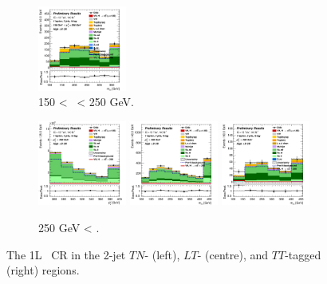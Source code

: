\begin{figure}[h!]
\begin{subfigure}[b]{\textwidth}
        \includegraphics[width=0.32\textwidth]{Images/VH/Own_fit/postfit_VHcc/Region_distmBB_BMax250_BMin150_DCRHigh_J2_TTypett_T2_L1_Y6051_GlobalFit_conditionnal_mu1.png}
        \caption{150 < \ptv\ < 250 GeV.}
        \label{fig:plots_VHcc_1L_150_CRH_2J}
    \end{subfigure}
    \begin{subfigure}[b]{\textwidth}
        \centering
        \includegraphics[width=0.32\textwidth]{Images/VH/Own_fit/postfit_VHcc/Region_distpTV_BMin250_DCRHigh_J2_TTypent_T1_L1_Y6051_GlobalFit_conditionnal_mu1.png}
        \includegraphics[width=0.32\textwidth]{Images/VH/Own_fit/postfit_VHcc/Region_distmBB_BMin250_DCRHigh_J2_TTypelt_T2_L1_Y6051_GlobalFit_conditionnal_mu1.png}
        \includegraphics[width=0.32\textwidth]{Images/VH/Own_fit/postfit_VHcc/Region_distmBB_BMin250_DCRHigh_J2_TTypett_T2_L1_Y6051_GlobalFit_conditionnal_mu1.png}
        \caption{250 GeV < \ptv.}
        \label{fig:plots_VHcc_1L_250_CRH_2J}
    \end{subfigure}
    \caption{The 1L \highdr\ CR in the 2-jet $TN$- (left), $LT$- (centre), and $TT$-tagged (right) regions.}
    \label{fig:plots_VHcc_1L_CRH_2J}
\end{figure}

